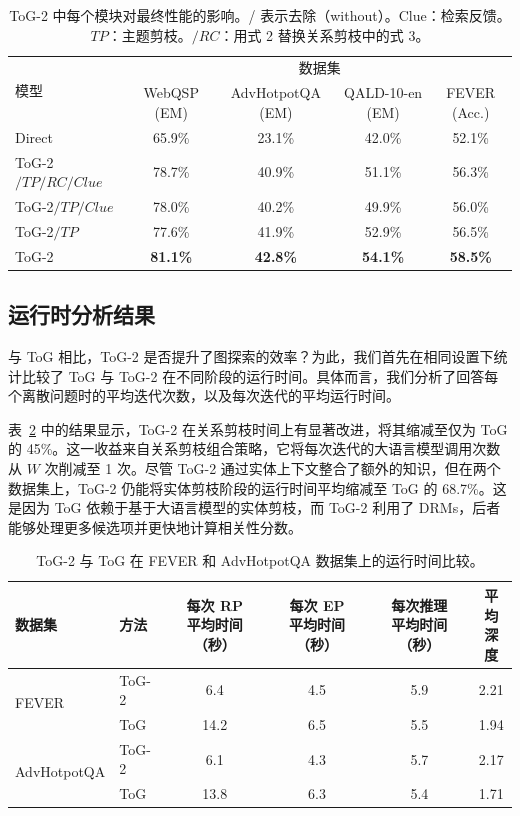 \documentclass[11pt,UTF8,fontset=fandol]{ctexart}
\newcommand{\toctwo}{ToG-2}
\begin{document}
\begin{table}[H]\centering
\caption{\toctwo{} 中每个模块对最终性能的影响。/ 表示去除（without）。Clue：检索反馈。$TP$：主题剪枝。$/RC$：用式 2 替换关系剪枝中的式 3。}
\setlength{\tabcolsep}{6pt}
\renewcommand{\arraystretch}{1.2}
\small
\begin{tabular}{lcccc}
\toprule
\multirow{2}{*}{模型} & \multicolumn{4}{c}{数据集}\\
\cmidrule(lr){2-5}
 & WebQSP (EM) & AdvHotpotQA (EM) & QALD-10-en (EM) & FEVER (Acc.)\\
\midrule
Direct & 65.9\% & 23.1\% & 42.0\% & 52.1\%\\
\toctwo{}$/TP/RC/Clue$ & 78.7\% & 40.9\% & 51.1\% & 56.3\%\\
\toctwo{}$/TP/Clue$ & 78.0\% & 40.2\% & 49.9\% & 56.0\%\\
\toctwo{}$/TP$ & 77.6\% & 41.9\% & 52.9\% & 56.5\%\\
\toctwo{} & \textbf{81.1\%} & \textbf{42.8\%} & \textbf{54.1\%} & \textbf{58.5\%}\\
\bottomrule
\end{tabular}
\label{tab:7}
\end{table}

\subsection{运行时分析结果}

与 ToG 相比，\toctwo{} 是否提升了图探索的效率？为此，我们首先在相同设置下统计比较了 ToG 与 \toctwo{} 在不同阶段的运行时间。具体而言，我们分析了回答每个离散问题时的平均迭代次数，以及每次迭代的平均运行时间。

表~\ref{tab:8} 中的结果显示，\toctwo{} 在关系剪枝时间上有显著改进，将其缩减至仅为 ToG 的 45\%。这一收益来自关系剪枝组合策略，它将每次迭代的大语言模型调用次数从 $W$ 次削减至 1 次。尽管 \toctwo{} 通过实体上下文整合了额外的知识，但在两个数据集上，\toctwo{} 仍能将实体剪枝阶段的运行时间平均缩减至 ToG 的 68.7\%。这是因为 ToG 依赖于基于大语言模型的实体剪枝，而 \toctwo{} 利用了 DRMs，后者能够处理更多候选项并更快地计算相关性分数。

\begin{table}[H]\centering
\caption{\toctwo{} 与 ToG 在 FEVER 和 AdvHotpotQA 数据集上的运行时间比较。}
\setlength{\tabcolsep}{5pt}
\renewcommand{\arraystretch}{1.2}
\small
\begin{tabular}{llcccc}
\toprule
数据集 & 方法 & \makecell{每次 RP\\平均时间（秒）} & \makecell{每次 EP\\平均时间（秒）} & \makecell{每次推理\\平均时间（秒）} & \makecell{平均\\深度}\\
\midrule
\multirow{2}{*}{FEVER} & \toctwo{} & 6.4 & 4.5 & 5.9 & 2.21\\
 & ToG & 14.2 & 6.5 & 5.5 & 1.94\\
\midrule
\multirow{2}{*}{AdvHotpotQA} & \toctwo{} & 6.1 & 4.3 & 5.7 & 2.17\\
 & ToG & 13.8 & 6.3 & 5.4 & 1.71\\
\bottomrule
\end{tabular}
\label{tab:8}
\end{table}
\end{document}
